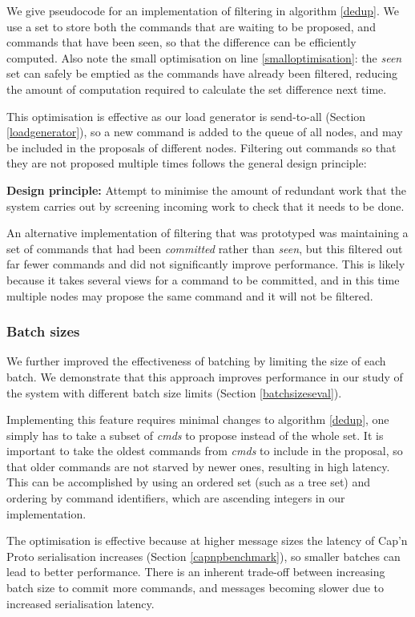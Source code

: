 We give pseudocode for an implementation of filtering in algorithm \ref{dedup}. We use a set to store both the commands that are waiting to be proposed, and commands that have been seen, so that the difference can be efficiently computed. Also note the small optimisation on line \ref{smalloptimisation}: the \textit{seen} set can safely be emptied as the commands have already been filtered, reducing the amount of computation required to calculate the set difference next time.

This optimisation is effective as our load generator is send-to-all (Section \ref{loadgenerator}), so a new command is added to the queue of all nodes, and may be included in the proposals of different nodes. Filtering out commands so that they are not proposed multiple times follows the general design principle:

\textbf{Design principle: } Attempt to minimise the amount of redundant work that the system carries out by screening incoming work to check that it needs to be done.

An alternative implementation of filtering that was prototyped was maintaining a set of commands that had been \textit{committed} rather than \textit{seen}, but this filtered out far fewer commands and did not significantly improve performance. This is likely because it takes several views for a command to be committed, and in this time multiple nodes may propose the same command and it will not be filtered.

\subsubsection{Batch sizes} \label{batchsizes}
We further improved the effectiveness of batching by limiting the size of each batch. We demonstrate that this approach improves performance in our study of the system with different batch size limits (Section \ref{batchsizeseval}).

Implementing this feature requires minimal changes to algorithm \ref{dedup}, one simply has to take a subset of \textit{cmds} to propose instead of the whole set. It is important to take the oldest commands from \textit{cmds} to include in the proposal, so that older commands are not starved by newer ones, resulting in high latency. This can be accomplished by using an ordered set (such as a tree set) and ordering by command identifiers, which are ascending integers in our implementation.

The optimisation is effective because at higher message sizes the latency of Cap'n Proto serialisation increases (Section \ref{capnpbenchmark}), so smaller batches can lead to better performance. There is an inherent trade-off between increasing batch size to commit more commands, and messages becoming slower due to increased serialisation latency.


